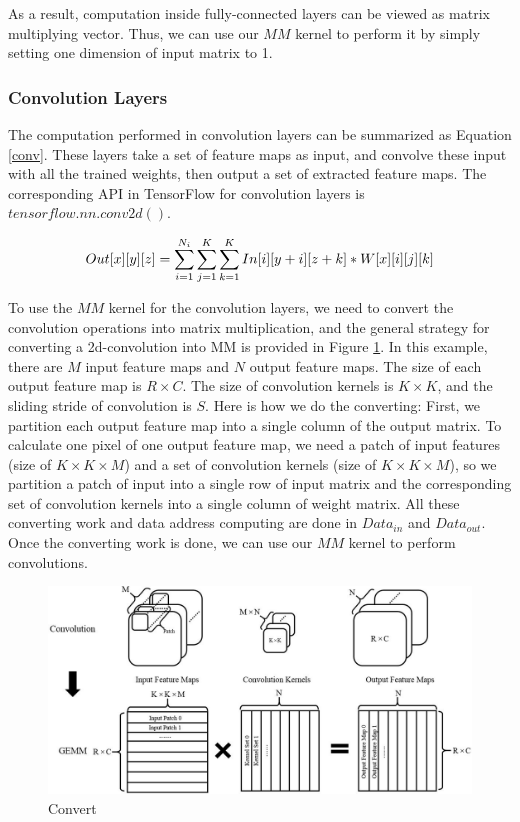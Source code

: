 \documentclass{acm_proc_article-sp-copy}
\begin{document}
As a result, computation inside fully-connected layers can be viewed as matrix multiplying vector. Thus, we can use our $MM$ kernel to perform it by simply setting one dimension of input matrix to 1. 

\subsubsection{Convolution Layers}
The computation performed in convolution layers can be summarized as Equation \ref{conv}. These layers take a set of feature maps as input, and convolve these input with all the trained weights, then output a set of extracted feature maps. The corresponding API in TensorFlow for convolution layers is $tensorflow.nn.conv2d()$.

\begin{equation}
\centering
Out[x][y][z]=\sum_{i=1}^{N_i}\sum_{j=1}^{K}\sum_{k=1}^{K}In[i][y+i][z+k]*W[x][i][j][k]
\label{conv}
\end{equation}

To use the $MM$ kernel for the convolution layers, we need to convert the convolution operations into matrix multiplication, and the general strategy for converting a 2d-convolution into MM is provided in Figure \ref{convert}. In this example, there are $M$ input feature maps and $N$ output feature maps. The size of each output feature map is $R\times C$. The size of convolution kernels is $K\times K$, and the sliding stride of convolution is $S$. Here is how we do the converting: First, we partition each output feature map into a single column of the output matrix. To calculate one pixel of one output feature map, we need a patch of input features (size of $K\times K\times M$) and a set of convolution kernels (size of $K\times K\times M$), so we partition a patch of input into a single row of input matrix and the corresponding set of convolution kernels into a single column of weight matrix. All these converting work and data address computing are done in $Data_{in}$ and $Data_{out}$. Once the converting work is done,  we can use our $MM$ kernel to perform convolutions.

\begin{figure}
	\centering
	\includegraphics[width=1.0\linewidth]{./figure/convert.jpg}
	\caption{Convert}
	\label{convert}
\end{figure}
\end{document}
